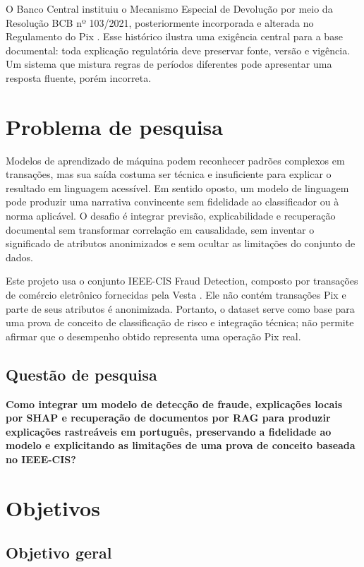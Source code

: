 O Banco Central instituiu o Mecanismo Especial de Devolução por meio da Resolução BCB nº 103/2021, posteriormente incorporada e alterada no Regulamento do Pix \cite{bcb_resolucao103_2021,bcb_resolucao1_2020}. Esse histórico ilustra uma exigência central para a base documental: toda explicação regulatória deve preservar fonte, versão e vigência. Um sistema que mistura regras de períodos diferentes pode apresentar uma resposta fluente, porém incorreta.

\section{Problema de pesquisa}

Modelos de aprendizado de máquina podem reconhecer padrões complexos em transações, mas sua saída costuma ser técnica e insuficiente para explicar o resultado em linguagem acessível. Em sentido oposto, um modelo de linguagem pode produzir uma narrativa convincente sem fidelidade ao classificador ou à norma aplicável. O desafio é integrar previsão, explicabilidade e recuperação documental sem transformar correlação em causalidade, sem inventar o significado de atributos anonimizados e sem ocultar as limitações do conjunto de dados.

Este projeto usa o conjunto IEEE-CIS Fraud Detection, composto por transações de comércio eletrônico fornecidas pela Vesta \cite{ieee_cis_2019}. Ele não contém transações Pix e parte de seus atributos é anonimizada. Portanto, o dataset serve como base para uma prova de conceito de classificação de risco e integração técnica; não permite afirmar que o desempenho obtido representa uma operação Pix real.

\subsection{Questão de pesquisa}

\textbf{Como integrar um modelo de detecção de fraude, explicações locais por SHAP e recuperação de documentos por RAG para produzir explicações rastreáveis em português, preservando a fidelidade ao modelo e explicitando as limitações de uma prova de conceito baseada no IEEE-CIS?}

\section{Objetivos}

\subsection{Objetivo geral}

